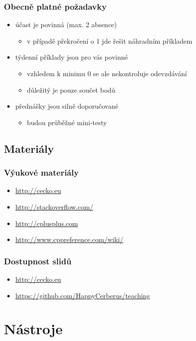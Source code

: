 \begin{frame}
	\frametitle{Obecně platné požadavky}
	\begin{itemize}
		\item{účast je povinná (max. 2 absence)}
		\begin{itemize}
			\item{v případě překročení o 1 jde řešit náhradním příkladem}
		\end{itemize}
		\item{týdenní příklady jsou pro vás povinné}
		\begin{itemize}
			\item{vzhledem k minimu 0 se ale nekontroluje odevzdávání}
			\item{důležitý je pouze součet bodů}
		\end{itemize}
		\item{přednášky jsou silně doporučované}
		\begin{itemize}
			\item{budou průběžné mini-testy}
		\end{itemize}
	\end{itemize}
\end{frame}

\subsection{Materiály}

\begin{frame}
	\frametitle{Výukové materiály}
	\begin{itemize}
		\item{\url{http://cecko.eu}}
		\item{\url{http://stackoverflow.com/}}
		\item{\url{http://cplusplus.com}}
		\item{\url{http://www.cppreference.com/wiki/}}
	\end{itemize}
\end{frame}

\begin{frame}
	\frametitle{Dostupnost slidů}
	\begin{itemize}
		\item{\url{http://cecko.eu}}
		\item{\url{https://github.com/HappyCerberus/teaching}}
	\end{itemize}
\end{frame}

\section{Nástroje}
